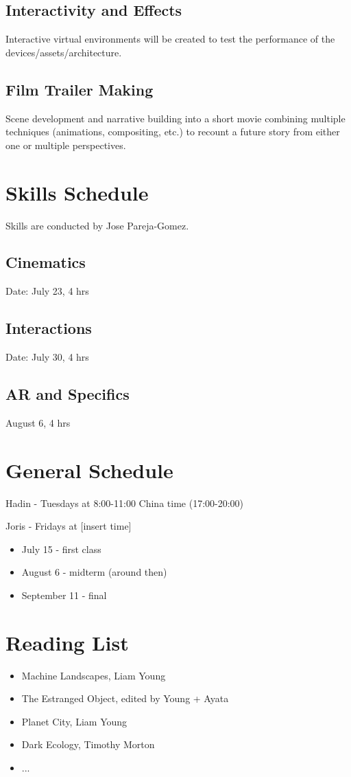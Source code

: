 \documentclass{article}
\begin{document}
\subsection{Interactivity and Effects}
Interactive virtual environments will be created to test the performance of the devices/assets/architecture.

\subsection{Film Trailer Making}
Scene development and narrative building into a short movie combining multiple techniques (animations, compositing, etc.) to recount a future story from either one or multiple perspectives.

\section{Skills Schedule}
Skills are conducted by Jose Pareja-Gomez.

\subsection{Cinematics}
Date: July 23, 4 hrs

\subsection{Interactions}
Date: July 30, 4 hrs

\subsection{AR and Specifics}
August 6, 4 hrs

\section{General Schedule}
Hadin - Tuesdays at 8:00-11:00 China time (17:00-20:00)

Joris - Fridays at [insert time]

\begin{itemize}
    \item July 15 - first class
    \item August 6 - midterm (around then)
    \item September 11 - final
\end{itemize}

\section{Reading List}
\begin{itemize}
    \item Machine Landscapes, Liam Young
    \item The Estranged Object, edited by Young + Ayata
    \item Planet City, Liam Young
    \item Dark Ecology, Timothy Morton
    \item ...
\end{itemize}
\end{document}
